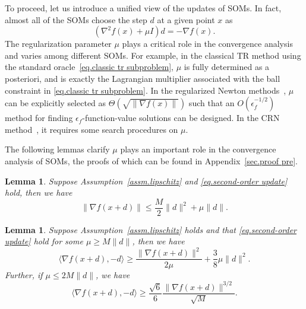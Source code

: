 \documentclass{article}
\newtheorem{lemma}[theorem]{Lemma}
\numberwithin{equation}{section}
\numberwithin{equation}{section}
\begin{document}
To proceed, let us introduce a unified view of the updates of SOMs. In fact, almost all of the SOMs choose the step $d$ at a given point $x$ as
\begin{equation}
    \label{eq.second-order update}
    (\nabla^2 f(x) + \mu I )d = -\nabla f(x).
\end{equation}
The regularization parameter $\mu$ plays a critical role in the convergence analysis and varies among different SOMs. For example, in the classical TR method using the standard oracle~\eqref{eq.classic tr subproblem}, $\mu$ is fully determined as a posteriori, and is exactly the Lagrangian multiplier associated with the ball constraint in \eqref{eq.classic tr subproblem}. In the regularized Newton methods~\cite{mishchenko2023regularized}, $\mu$ can be explicitly selected as $\Theta(\sqrt{\|\nabla f(x)\|})$ such that an $O(\epsilon_f^{-1/2})$ method for finding $\epsilon_f$-function-value solutions can be designed. In the CRN method~\cite{nesterov2006cubic}, it requires some search procedures on $\mu$.

The following lemmas clarify $\mu$ plays an important role in the convergence analysis of SOMs, the proofs of which can be found in Appendix~\ref{sec.proof pre}.
\begin{lemma}
    \label{lem.bound next gradient}
    Suppose Assumption~\ref{assm.lipschitz} and \eqref{eq.second-order update} hold, then we have
    \begin{equation}
        \label{eq.bound next gradient}
        \|\nabla f(x+d)\| \leq \frac{M}{2}\|d\|^2+\mu\|d\|.
    \end{equation}
\end{lemma}

\begin{lemma}
    \label{lem.inner product g and d}
    Suppose Assumption~\ref{assm.lipschitz} holds and that \eqref{eq.second-order update} hold for some $\mu\geq M\|d\|$, then we have
    \begin{equation}
        \label{eq.inner product g d}
        \langle \nabla f(x+d),-d \rangle \geq \frac{\|\nabla f(x+d)\|^2}{2\mu}+\frac{3}{8}\mu \|d\|^2.
    \end{equation}
    Further, if $\mu \leq 2M\|d\|$, we have
    \begin{equation}
        \label{eq.inner product g d advanced}
        \langle \nabla f(x+d),-d \rangle \geq \frac{\sqrt{6}}{6} \frac{\|\nabla f(x+d)\|^{3/2}}{\sqrt{M}}.
    \end{equation}
\end{lemma}
\end{document}
